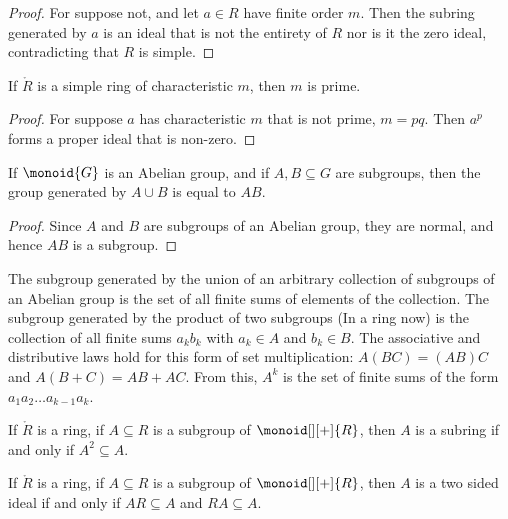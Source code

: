 \documentclass{article}                                                        %
\begin{document}
                \begin{proof}
                    For suppose not, and let $a\in{R}$ have finite order $m$.
                    Then the subring generated by $a$ is an ideal that is not
                    the entirety of $R$ nor is it the zero ideal, contradicting
                    that $R$ is simple.
                \end{proof}
                \begin{theorem}
                    If $\ring{R}$ is a simple ring of characteristic $m$, then
                    $m$ is prime.
                \end{theorem}
                \begin{proof}
                    For suppose $a$ has characteristic $m$ that is not prime,
                    $m=pq$. Then $a^{p}$ forms a proper ideal that is non-zero.
                \end{proof}
                \begin{theorem}
                    If $\monoid{G}$ is an Abelian group, and if
                    $A,B\subseteq{G}$ are subgroups, then the group generated
                    by $A\cup{B}$ is equal to $AB$.
                \end{theorem}
                \begin{proof}
                    Since $A$ and $B$ are subgroups of an Abelian group, they
                    are normal, and hence $AB$ is a subgroup.
                \end{proof}
                The subgroup generated by the union of an arbitrary collection
                of subgroups of an Abelian group is the set of all finite sums
                of elements of the collection. The subgroup generated by the
                product of two subgroups (In a ring now) is the collection of
                all finite sums $a_{k}b_{k}$ with $a_{k}\in{A}$ and
                $b_{k}\in{B}$. The associative and distributive laws hold for
                this form of set multiplication: $A(BC)=(AB)C$ and
                $A(B+C)=AB+AC$. From this, $A^{k}$ is the set of finite sums of
                the form $a_{1}a_{2}\dots{a}_{k-1}a_{k}$.
                \begin{theorem}
                    If $\ring{R}$ is a ring, if $A\subseteq{R}$ is a subgroup of
                    $\monoid[][+]{R}$, then $A$ is a subring if and only if
                    $A^{2}\subseteq{A}$.
                \end{theorem}
                \begin{theorem}
                    If $\ring{R}$ is a ring, if $A\subseteq{R}$ is a subgroup of
                    $\monoid[][+]{R}$, then $A$ is a two sided ideal if and
                    only if $AR\subseteq{A}$ and $RA\subseteq{A}$.
                \end{theorem}
\end{document}
